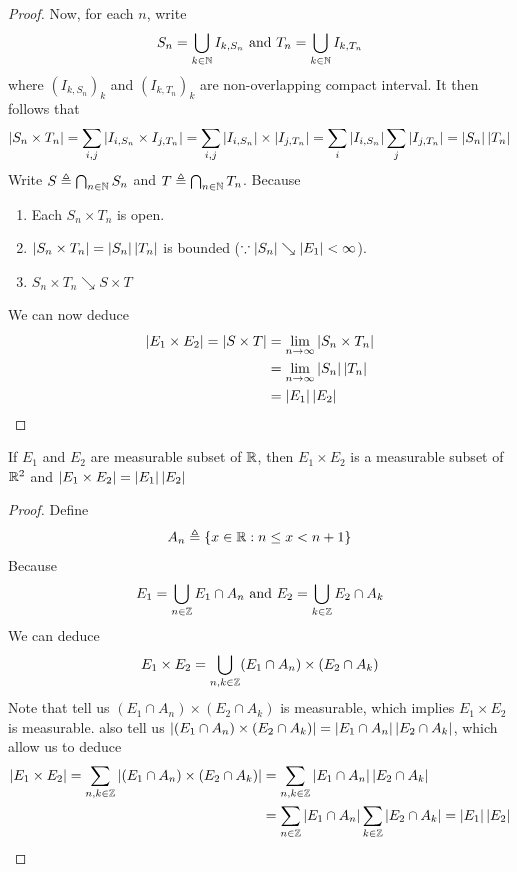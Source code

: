 \documentclass{report}
\begin{document}
\begin{proof}
Now, for each $n$, write 
 \begin{align*}
S_n= \bigcup_{k \in\mathbb{N}} I_{k,S_n} \text{ and } T_n= \bigcup_{k\in\mathbb{N}} I_{k,T_n}
\end{align*}
where $(I_{k,S_n})_k$ and $(I_{k,T_n})_k$ are non-overlapping compact interval. It then follows that 
\begin{align*}
  \left|S_n \times T_n\right| =  \sum_{i,j} \left|I_{i,S_n} \times I_{j,T_n}\right|= \sum_{i,j} \left|I_{i,S_n}\right|\times \left|I_{j,T_n}\right|= \sum_i \left|I_{i,S_n}\right| \sum_j \left|I_{j,T_n}\right|= \left|S_n\right| \left|T_n\right|
\end{align*}
Write $S\triangleq \bigcap_{n\in\mathbb{N}} S_n$ and $T\triangleq \bigcap_{n\in\mathbb{N}}T_n$. Because
\begin{enumerate}[label=(\alph*)]
  \item Each  $S_n \times T_n$ is open.   
  \item $\left|S_n\times T_n\right|= \left|S_n\right|\left|T_n\right|$ is bounded ($\because \left|S_n\right|\searrow \left|E_1\right|<\infty$). 
  \item $S_n \times T_n \searrow S \times T$
\end{enumerate}
We can now deduce 
\begin{align*}
\left|E_1 \times E_2\right|= \left|S \times T\right|&= \lim_{n\to \infty} \left|S_n \times T_n\right| \\
&=\lim_{n\to \infty} \left|S_n\right| \left|T_n\right| \\
&=\left|E_1\right| \left|E_2\right|
\end{align*}



\end{proof}
\begin{question}{}{}
If $E_1$ and  $E_2$ are measurable subset of  $\mathbb{R}$, then $E_1\times E_2$ is a measurable subset of $\mathbb{R}^2$ and  $\left|E_1\times E_2\right|=\left|E_1\right|\left|E_2\right|$
\end{question}
\begin{proof}
Define 
\begin{align*}
A_n\triangleq \{ x\in\mathbb{R}: n\leq x< n+1 \}
\end{align*}
Because 
\begin{align*}
E_1= \bigcup_{n\in\mathbb{Z}} E_1 \cap A_n\text{ and }E_2=\bigcup_{k\in\mathbb{Z}} E_2 \cap A_k
\end{align*}
We can deduce
\begin{align*}
E_1 \times E_2 = \bigcup_{n,k\in\mathbb{Z}} (E_1 \cap A_n)\times (E_2 \cap A_k)
\end{align*}
Note that  tell us $(E_1 \cap A_n) \times (E_2 \cap A_k)$ is measurable, which implies $E_1\times E_2$ is measurable.  also tell us  $\left|(E_1\cap A_n)\times (E_2 \cap A_k)\right|= \left|E_1 \cap A_n\right|\left|E_2 \cap A_k\right|$, which allow us to deduce 
\begin{align*}
\left|E_1 \times E_2\right|= \sum_{n,k\in\mathbb{Z}} \left|(E_1 \cap A_n ) \times (E_2 \cap A_k)\right|&= \sum_{n,k\in\mathbb{Z}} \left|E_1 \cap A_n\right| \left|E_2 \cap A_k\right| \\
&=\sum_{n\in\mathbb{Z}} \left|E_1 \cap A_n\right| \sum_{k\in\mathbb{Z}} \left|E_2 \cap A_k\right|= \left|E_1\right| \left|E_2\right|
\end{align*}
\end{proof}
\end{document}
